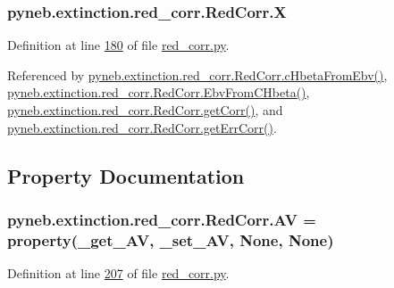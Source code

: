\begin{DoxyVerb}
\hypertarget{classpyneb_1_1extinction_1_1red__corr_1_1_red_corr_aac92bb80311cda78c01e61aa44655251}{
\subsubsection[{X}]{\setlength{\rightskip}{0pt plus 5cm}pyneb.\-extinction.\-red\-\_\-corr.\-Red\-Corr.\-X}}\label{classpyneb_1_1extinction_1_1red__corr_1_1_red_corr_aac92bb80311cda78c01e61aa44655251}


Definition at line \hyperlink{red__corr_8py_source_l00180}{180} of file \hyperlink{red__corr_8py_source}{red\-\_\-corr.\-py}.



Referenced by \hyperlink{red__corr_8py_source_l00091}{pyneb.\-extinction.\-red\-\_\-corr.\-Red\-Corr.\-c\-Hbeta\-From\-Ebv()}, \hyperlink{red__corr_8py_source_l00107}{pyneb.\-extinction.\-red\-\_\-corr.\-Red\-Corr.\-Ebv\-From\-C\-Hbeta()}, \hyperlink{red__corr_8py_source_l00211}{pyneb.\-extinction.\-red\-\_\-corr.\-Red\-Corr.\-get\-Corr()}, and \hyperlink{red__corr_8py_source_l00251}{pyneb.\-extinction.\-red\-\_\-corr.\-Red\-Corr.\-get\-Err\-Corr()}.



\subsection{Property Documentation}
\hypertarget{classpyneb_1_1extinction_1_1red__corr_1_1_red_corr_acbf4ca9cf48abed38b1ffad057420c71}{
\subsubsection[{A\-V}]{\setlength{\rightskip}{0pt plus 5cm}pyneb.\-extinction.\-red\-\_\-corr.\-Red\-Corr.\-A\-V = property({\bf \-\_\-get\-\_\-\-A\-V}, {\bf \-\_\-set\-\_\-\-A\-V}, None, None)\hspace{0.3cm}{\ttfamily [static]}}}\label{classpyneb_1_1extinction_1_1red__corr_1_1_red_corr_acbf4ca9cf48abed38b1ffad057420c71}


Definition at line \hyperlink{red__corr_8py_source_l00207}{207} of file \hyperlink{red__corr_8py_source}{red\-\_\-corr.\-py}.


\end{DoxyVerb}
